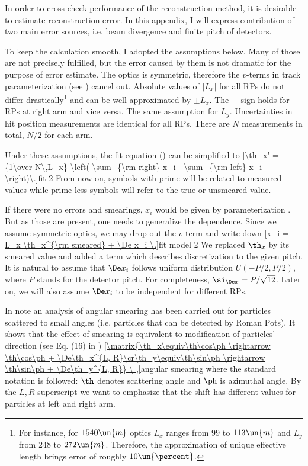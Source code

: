 
In order to cross-check performance of the reconstruction method, it is desirable to estimate reconstruction error. In this appendix, I will express contribution of two main error sources, i.e. beam divergence and finite pitch of detectors.

To keep the calculation smooth, I adopted the assumptions below. Many of those are not precisely fulfilled, but the error caused by them is not dramatic for the purpose of error estimate.
\bitm
\itm The optics is symmetric, therefore the $v$-terms in track parameterization (see ) cancel out.
\itm Absolute values of $|L_x|$ for all RPs do not differ drastically\footnote{%
For instance, for $1540\un{m}$ optics $L_x$ ranges from $99$ to $113\un{m}$ and $L_y$ from $248$ to $272\un{m}$. Therefore, the approximation of unique effective length brings error of roughly $10\un{\percent}$.
}
and can be well approximated by $\pm L_x$. The $+$ sign holds for RPs at right arm and vice versa. The same assumption for $L_y$.
\itm Uncertainties in hit position measurements are identical for all RPs. 
\itm There are $N$ measurements in total, $N/2$ for each arm.
\eitm

\vskip2mm
Under these assumptions, the fit equation () can be simplified to
\eqref{\th_x' = {1\over N\,L_x} \left( \sum_{\rm right} x_i - \sum_{\rm left} x_i \right)\.}{fit 2}
From now on, symbols with prime will be related to measured values while prime-less symbols will refer to the true or unsmeared value. 

If there were no errors and smearings, $x_i$ would be given by parameterization . But as those are present, one needs to generalize the dependence. Since we assume symmetric optics, we may drop out the $v$-term and write down
\eqref{x_i = L_x \th_x^{\rm smeared} + \De x_i \.}{fit model 2}
We replaced $\th_x$ by its smeared value and added a term which describes discretization to the given pitch. It is natural to assume that $\De x_i$ follows uniform distribution $U(-P/2, P/2)$, where $P$ stands for the detector pitch. For completeness, $\si_{\De x} = P / \sqrt{12}$. Later on, we will also assume $\De x_i$ to be independent for different RPs.

In note  an analysis of angular smearing has been carried out for particles scattered to small angles (i.e. particles that can be detected by Roman Pots). It shows that the effect of smearing is equivalent to modification of particles' direction (see Eq. (16) in )
\eqref{\matrix{\th_x\equiv\th\cos\ph \rightarrow \th\cos\ph + \De\th_x^{L, R}\cr\th_y\equiv\th\sin\ph \rightarrow \th\sin\ph + \De\th_y^{L, R}}  \ ,}{angular smearing}
where the standard notation is followed: $\th$ denotes scattering angle and $\ph$ is azimuthal angle. By the $L, R$ superscript we want to emphasize that the shift has different values for particles at left and right arm.

